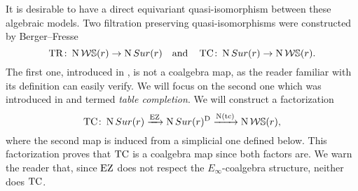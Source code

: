 It is desirable to have a direct equivariant quasi-isomorphism between these algebraic models.
Two filtration preserving quasi-isomorphisms were constructed by Berger--Fresse
\[
\operatorname{TR} \colon \operatorname{N}\mathcal{W}\mathbb{S}(r) \to \operatorname{N}Sur(r)
\quad \text{and} \quad
\operatorname{TC} \colon \operatorname{N}Sur(r) \to \operatorname{N} \mathcal{W}\mathbb{S}(r).
\]
The first one, introduced in \cite[1$\cdot$3]{berger2004combinatorial}, is not a coalgebra map, as the reader familiar with its definition can easily verify.
We will focus on the second one which was introduced in \cite{berger2002prismatic} and termed \textit{table completion}.
We will construct a factorization
\[
\operatorname{TC} \colon \operatorname{N}Sur(r) \xrightarrow{\operatorname{EZ}} \operatorname{N}Sur(r)^{\mathrm{D}} \xrightarrow{\operatorname{N}(\operatorname{tc})} \operatorname{N} \mathcal{W}\mathbb{S}(r),
\]
where the second map is induced from a simplicial one defined below.
This factorization proves that $\operatorname{TC}$ is a coalgebra map since both factors are.
We warn the reader that, since $\operatorname{EZ}$ does not respect the $E_\infty$-coalgebra structure,
neither does $\operatorname{TC}$.

%


